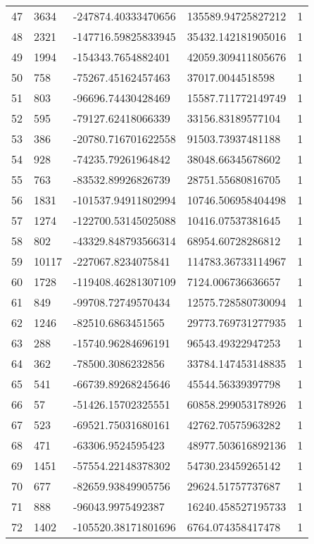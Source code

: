 \begin{longtable}{lllll}
    47 & 3634 & -247874.40333470656 & 135589.94725827212 & 1 \\
    48 & 2321 & -147716.59825833945 & 35432.142181905016 & 1 \\
    49 & 1994 & -154343.7654882401 & 42059.309411805676 & 1 \\
    50 & 758 & -75267.45162457463 & 37017.0044518598 & 1 \\
    51 & 803 & -96696.74430428469 & 15587.711772149749 & 1 \\
    52 & 595 & -79127.62418066339 & 33156.83189577104 & 1 \\
    53 & 386 & -20780.716701622558 & 91503.73937481188 & 1 \\
    54 & 928 & -74235.79261964842 & 38048.66345678602 & 1 \\
    55 & 763 & -83532.89926826739 & 28751.55680816705 & 1 \\
    56 & 1831 & -101537.94911802994 & 10746.506958404498 & 1 \\
    57 & 1274 & -122700.53145025088 & 10416.07537381645 & 1 \\
    58 & 802 & -43329.848793566314 & 68954.60728286812 & 1 \\
    59 & 10117 & -227067.8234075841 & 114783.36733114967 & 1 \\
    60 & 1728 & -119408.46281307109 & 7124.006736636657 & 1 \\
    61 & 849 & -99708.72749570434 & 12575.728580730094 & 1 \\
    62 & 1246 & -82510.6863451565 & 29773.769731277935 & 1 \\
    63 & 288 & -15740.96284696191 & 96543.49322947253 & 1 \\
    64 & 362 & -78500.3086232856 & 33784.147453148835 & 1 \\
    65 & 541 & -66739.89268245646 & 45544.56339397798 & 1 \\
    66 & 57 & -51426.15702325551 & 60858.299053178926 & 1 \\
    67 & 523 & -69521.75031680161 & 42762.70575963282 & 1 \\
    68 & 471 & -63306.9524595423 & 48977.503616892136 & 1 \\
    69 & 1451 & -57554.22148378302 & 54730.23459265142 & 1 \\
    70 & 677 & -82659.93849905756 & 29624.51757737687 & 1 \\
    71 & 888 & -96043.9975492387 & 16240.458527195733 & 1 \\
    72 & 1402 & -105520.38171801696 & 6764.074358417478 & 1 \\

\end{longtable}
